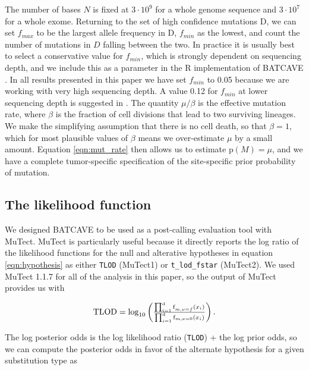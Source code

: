 \documentclass[a4,center,fleqn]{NAR}
\newcommand{\batcave}{BATCAVE }
\begin{document}
The number of bases $N$ is fixed at $3\cdot10^9$ for a whole genome sequence and $3\cdot10^7$ for a whole exome.
Returning to the set of high confidence mutations $\mathrm{D}$, we can set $f_{max}$ to be the largest allele frequency in $\mathrm{D}$, $f_{min}$ as the lowest, and count the number of mutations in $D$ falling between the two.
In practice it is usually best to select a conservative value for $f_{min}$, which is strongly dependent on sequencing depth, and we include this as a parameter in the R implementation of \batcave.
In all results presented in this paper we have set $f_{min}$ to 0.05 because we are working with very high sequencing depth.
A value 0.12 for $f_{min}$ at lower sequencing depth is suggested in \citet{Williams2016}.
The quantity $\mu/\beta$ is the effective mutation rate, where $\beta$ is the fraction of cell divisions that lead to two surviving lineages.
We make the simplifying assumption that there is no cell death, so that $\beta = 1$, which for most plausible values of $\beta$ means we over-estimate $\mu$ by a small amount.
Equation \ref{eqn:mut_rate} then allows us to estimate $\mathrm{p}(M) = \mu$, and we have a complete tumor-specific specification of the site-specific prior probability of mutation.

\subsection{The likelihood function}
We designed \batcave to be used as a post-calling evaluation tool with MuTect.
MuTect is particularly useful because it directly reports the log ratio of the likelihood functions for the null and alterative hypotheses in equation \ref{eqn:hypothesis} as either \texttt{TLOD} (MuTect1) or \texttt{t\_lod\_fstar} (MuTect2).
We used MuTect 1.1.7 for all of the analysis in this paper, so the output of MuTect provides us with

\begin{equation}
  \label{eqn:tlod}
    $$
    \mathrm{TLOD} = \mathrm{log}_{10}\left(\frac{\prod_{i=1}^{\mathrm{d}} \textrm{f}_{m,\nu = \hat{f}}(x_i)}{\prod_{i=1}^{\mathrm{d}} \textrm{f}_{m,\nu = 0}(x_i)}\right).
    $$
\end{equation}

The log posterior odds is the log likelihood ratio (\texttt{TLOD}) + the log prior odds, so we can compute the posterior odds in favor of the alternate hypothesis for a given substitution type as
\end{document}

